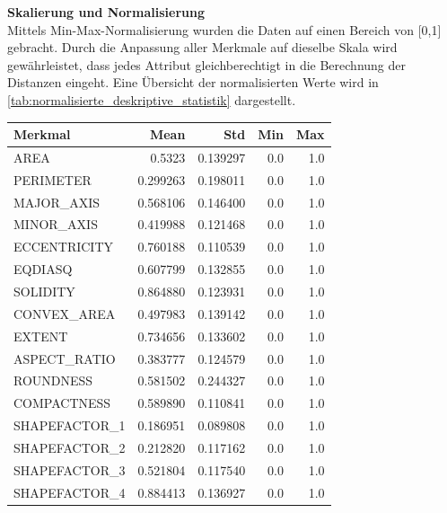 \textbf{Skalierung und Normalisierung}\\
Mittels Min-Max-Normalisierung wurden die Daten auf einen Bereich von [0,1] gebracht.
Durch die Anpassung aller Merkmale auf dieselbe Skala wird gewährleistet, dass jedes Attribut gleichberechtigt in die Berechnung der Distanzen eingeht.
Eine Übersicht der normalisierten Werte wird in \autoref{tab:normalisierte_deskriptive_statistik} dargestellt.\\


{
	\tiny
	\centering
	\begin{tabular}{lrrrr}
		\toprule
		{Merkmal}        & {Mean}    & {Std}     & {Min} & {Max} \\
		\midrule
		AREA           & 0.5323  & 0.139297 & 0.0 & 1.0 \\
		PERIMETER      & 0.299263 & 0.198011 & 0.0 & 1.0 \\
		MAJOR\_AXIS     & 0.568106 & 0.146400 & 0.0 & 1.0 \\
		MINOR\_AXIS     & 0.419988 & 0.121468 & 0.0 & 1.0 \\
		ECCENTRICITY   & 0.760188 & 0.110539 & 0.0 & 1.0 \\
		EQDIASQ        & 0.607799 & 0.132855 & 0.0 & 1.0 \\
		SOLIDITY       & 0.864880 & 0.123931 & 0.0 & 1.0 \\
		CONVEX\_AREA    & 0.497983 & 0.139142 & 0.0 & 1.0 \\
		EXTENT         & 0.734656 & 0.133602 & 0.0 & 1.0 \\
		ASPECT\_RATIO   & 0.383777 & 0.124579 & 0.0 & 1.0 \\
		ROUNDNESS      & 0.581502 & 0.244327 & 0.0 & 1.0 \\
		COMPACTNESS    & 0.589890 & 0.110841 & 0.0 & 1.0 \\
		SHAPEFACTOR\_1  & 0.186951 & 0.089808 & 0.0 & 1.0 \\
		SHAPEFACTOR\_2  & 0.212820 & 0.117162 & 0.0 & 1.0 \\
		SHAPEFACTOR\_3  & 0.521804 & 0.117540 & 0.0 & 1.0 \\
		SHAPEFACTOR\_4  & 0.884413 & 0.136927 & 0.0 & 1.0 \\
		\bottomrule
	\end{tabular}
	\label{tab:normalisierte_deskriptive_statistik}
}

